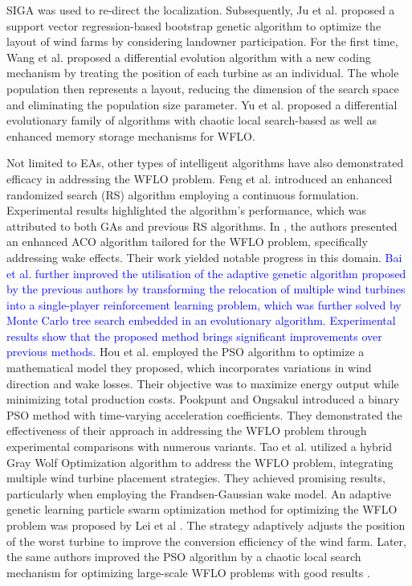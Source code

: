\documentclass[review]{elsarticle}
\begin{document}
SIGA was used to re-direct the localization. Subsequently, Ju et al. \cite{ju2019winda} proposed a support vector regression-based bootstrap genetic algorithm to optimize the layout of wind farms by considering landowner participation. For the first time, Wang et al. \cite{wang2017differential} proposed a differential evolution algorithm with a new coding mechanism by treating the position of each turbine as an individual. The whole population then represents a layout, reducing the dimension of the search space and eliminating the population size parameter. Yu et al. \cite{yu2023chaotic} proposed a differential evolutionary family of algorithms with chaotic local search-based as well as enhanced memory storage mechanisms for WFLO.

Not limited to EAs, other types of intelligent algorithms have also demonstrated efficacy in addressing the WFLO problem. Feng et al. \cite{feng2015solving} introduced an enhanced randomized search (RS) algorithm employing a continuous formulation. Experimental results highlighted the algorithm's performance, which was attributed to both GAs and previous RS algorithms. In \cite{erouglu2012design}, the authors presented an enhanced ACO algorithm tailored for the WFLO problem, specifically addressing wake effects. Their work yielded notable progress in this domain. \textcolor{blue}{Bai et al. \cite{bai2022wind} further improved the utilisation of the adaptive genetic algorithm proposed by the previous authors by transforming the relocation of multiple wind turbines into a single-player reinforcement learning problem, which was further solved by Monte Carlo tree search embedded in an evolutionary algorithm. Experimental results show that the proposed method brings significant improvements over previous methods.} Hou et al. \cite{hou2015optimized} employed the PSO algorithm to optimize a mathematical model they proposed, which incorporates variations in wind direction and wake losses. Their objective was to maximize energy output while minimizing total production costs. Pookpunt and Ongsakul \cite{pookpunt2013optimal} introduced a binary PSO method with time-varying acceleration coefficients. They demonstrated the effectiveness of their approach in addressing the WFLO problem through experimental comparisons with numerous variants. Tao et al. \cite{tao2019optimal} utilized a hybrid Gray Wolf Optimization algorithm to address the WFLO problem, integrating multiple wind turbine placement strategies. They achieved promising results, particularly when employing the Frandsen-Gaussian wake model. An adaptive genetic learning particle swarm optimization method for optimizing the WFLO problem was proposed by Lei et al \cite{lei2022adaptive}. The strategy adaptively adjusts the position of the worst turbine to improve the conversion efficiency of the wind farm. Later, the same authors improved the PSO algorithm by a chaotic local search mechanism for optimizing large-scale WFLO problems with good results \cite{lei2023chaotic}.
\end{document}
